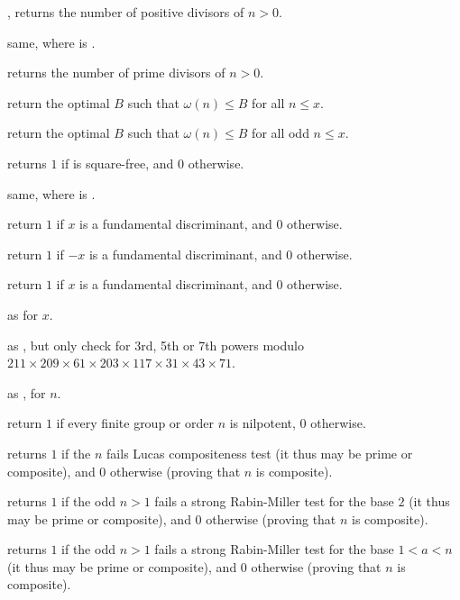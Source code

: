 , returns the number of positive divisors of $n>0$.

 same, where  is .

 returns the number of prime divisors of $n > 0$.

 return the optimal $B$ such that $\omega(n)
\leq B $ for all $n \leq x$.

 return the optimal $B$ such that $\omega(n)
\leq B $ for all odd $n \leq x$.

 returns $1$ if 
is square-free, and $0$ otherwise.

 same, where  is
.

 return $1$ if $x$ is a fundamental
discriminant, and $0$ otherwise.

 return $1$ if $-x$ is a fundamental
discriminant, and $0$ otherwise.

 return $1$ if $x$ is a fundamental
discriminant, and $0$ otherwise.

 as 
for  $x$.

 as , but
only check for 3rd, 5th or 7th powers modulo
$211\times209\times61\times203\times117\times31\times43\times71$.

 as , for
 $n$.

 return $1$ if every finite group or order $n$
is nilpotent, $0$ otherwise.

 returns $1$ if the  $n$ fails Lucas
compositeness test (it thus may be prime or composite), and $0$ otherwise
(proving that $n$ is composite).

 returns $1$ if the odd  $n > 1$ fails a
strong Rabin-Miller test for the base $2$ (it thus may be prime or
composite), and $0$ otherwise (proving that $n$ is composite).

 returns $1$ if the odd  $n > 1$
fails a strong Rabin-Miller test for the base $1 < a < n$ (it thus may be
prime or composite), and $0$ otherwise (proving that $n$ is composite).

